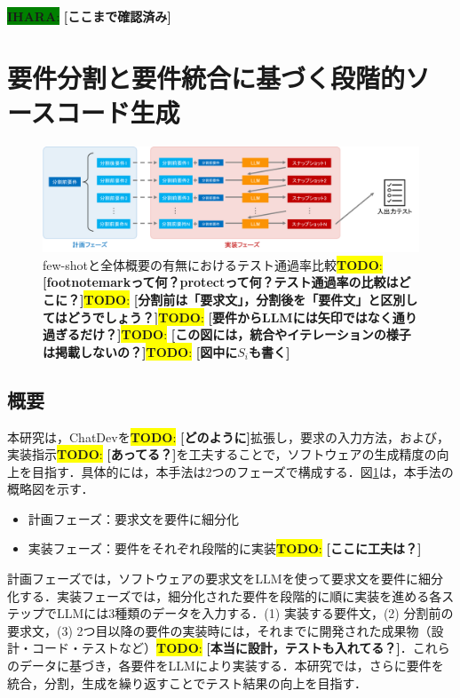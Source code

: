 \documentclass[submit,techrep,noauthor]{ipsj}
\newcommand{\todo}[1]{\colorbox{yellow}{{\bf TODO}:}{\color{red} {\textbf{[#1]}}}}
\newcommand{\ihara}[1]{\colorbox{green}{{\bf IHARA}:}{\color{blue} {\textbf{[#1]}}}}
\begin{document}
\ihara{ここまで確認済み}

\section{要件分割と要件統合に基づく段階的ソースコード生成}
\label{sec:method}

\begin{figure}[t]
    \centering
    \includegraphics[width=1.0\linewidth]{./Toyoshima_fig/approach_abst_v2.pdf}
    \caption{few-shotと全体概要の有無におけるテスト通過率比較\protect\footnotemark\todo{footnotemarkって何？protectって何？テスト通過率の比較はどこに？}\todo{分割前は「要求文」，分割後を「要件文」と区別してはどうでしょう？}\todo{要件からLLMには矢印ではなく通り過ぎるだけ？}\todo{この図には，統合やイテレーションの様子は掲載しないの？}\todo{図中に$S_i$も書く}}
    \label{approach_abst}
\end{figure}

\subsection{概要}

本研究は，ChatDevを\todo{どのように}拡張し，要求の入力方法，および，実装指示\todo{あってる？}を工夫することで，ソフトウェアの生成精度の向上を目指す．具体的には，本手法は2つのフェーズで構成する．図\ref{approach_abst}は，本手法の概略図を示す．
\begin{itemize}
\item 計画フェーズ：要求文を要件に細分化
\item 実装フェーズ：要件をそれぞれ段階的に実装\todo{ここに工夫は？}
\end{itemize}

計画フェーズでは，ソフトウェアの要求文をLLMを使って要求文を要件に細分化する．実装フェーズでは，細分化された要件を段階的に順に実装を進める各ステップでLLMには3種類のデータを入力する．(1) 実装する要件文，(2) 分割前の要求文，(3) 2つ目以降の要件の実装時には，それまでに開発された成果物（設計・コード・テストなど）\todo{本当に設計，テストも入れてる？}．これらのデータに基づき，各要件をLLMにより実装する．本研究では，さらに要件を統合，分割，生成を繰り返すことでテスト結果の向上を目指す．
\end{document}
